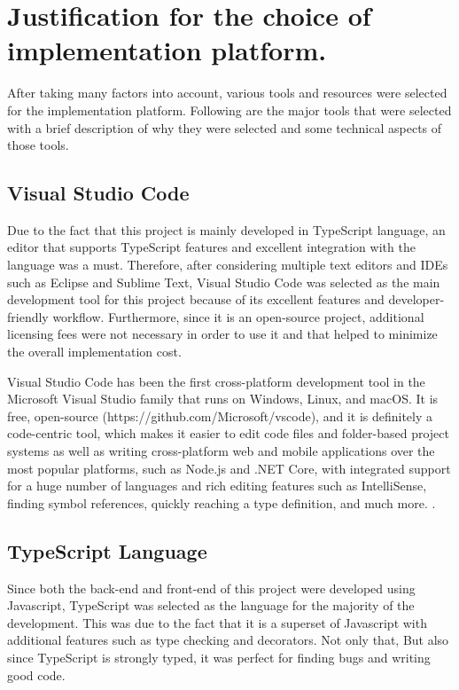 \documentclass[12pt]{report}
\begin{document}
\section{Justification for the choice of implementation platform.}
After taking many factors into account, various tools and resources were selected for the implementation platform. Following are the major tools that were selected with a brief description of why they were selected and some technical aspects of those tools.

\subsection{Visual Studio Code}
Due to the fact that this project is mainly developed in TypeScript language, an editor that supports TypeScript features and excellent integration with the language was a must. Therefore, after considering multiple text editors and IDEs such as Eclipse and Sublime Text, Visual Studio Code was selected as the main development tool for this project because of its excellent features and developer-friendly workflow. Furthermore, since it is an open-source project, additional licensing fees were not necessary in order to use it and that helped to minimize the overall implementation cost.

Visual Studio Code has been the first cross-platform development tool in the Microsoft Visual Studio family that runs on Windows, Linux, and macOS. It is free, open-source (https://github.com/Microsoft/vscode), and it is definitely a code-centric tool, which makes it easier to edit code files and folder-based project systems as well as writing cross-platform web and mobile applications over the most popular platforms, such as Node.js and .NET Core, with integrated support for a huge number of languages and rich editing features such as IntelliSense, finding symbol references, quickly reaching a type definition, and much more. \cite{alessandro_2019_visual_studio}.

\subsection{TypeScript Language}
Since both the back-end and front-end of this project were developed using Javascript, TypeScript was selected as the language for the majority of the development. This was due to the fact that it is a superset of Javascript with additional features such as type checking and decorators. Not only that, But also since TypeScript is strongly typed, it was perfect for finding bugs and writing good code.
\end{document}
